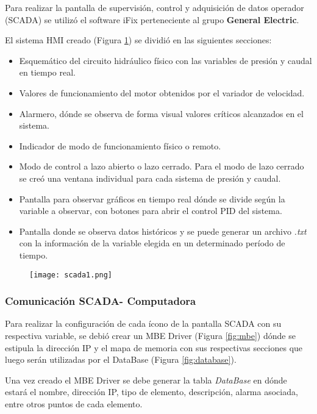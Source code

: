 Para realizar la pantalla de supervisión, control y adquisición de datos operador (SCADA) se utilizó el software iFix perteneciente al grupo \textbf{General Electric}.

El sistema HMI creado (Figura \ref{fig:scada1}) se dividió en las siguientes secciones:
\begin{itemize}
	\item Esquemático del circuito hidráulico físico con las variables de presión y caudal en tiempo real.
	\item Valores de funcionamiento del motor obtenidos por el variador de velocidad.
	\item Alarmero, dónde se observa de forma visual valores críticos alcanzados en el sistema.
	\item Indicador de modo de funcionamiento físico o remoto.
	\item Modo de control a lazo abierto o lazo cerrado.
	\subitem Para el modo de lazo cerrado se creó una ventana individual para cada sistema de presión y caudal.
	\item Pantalla para observar gráficos en tiempo real dónde se divide según la variable a observar, con botones para abrir el control PID del sistema.
	\item Pantalla donde se observa datos históricos y se puede generar un archivo \textit{.txt} con la información de la variable elegida en un determinado período de tiempo.
\end{itemize} 

\begin{figure}[htb]
	\centering
	\texttt{[image: scada1.png]}
	\label{fig:scada1}
\end{figure}


\subsubsection{Comunicación SCADA- Computadora}
Para realizar la configuración de cada ícono de la pantalla SCADA con su respectiva variable, se debió crear un MBE Driver (Figura \ref{fig:mbe}) dónde se estipula la dirección IP y el mapa de memoria con sus respectivas secciones que luego serán utilizadas por el DataBase (Figura \ref{fig:database}). 

Una vez creado el MBE Driver se debe generar la tabla \textit{DataBase} en dónde estará el nombre, dirección IP, tipo de elemento, descripción, alarma asociada, entre otros puntos de cada elemento.

